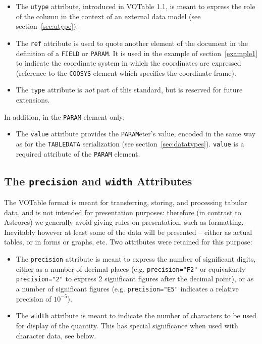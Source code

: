 \documentclass[11pt,a4paper]{ivoa}
\def\Aref#1{section~\ref{#1}}
\let\fg=\color
\def\attr#1{{\tt{\fg{DarkRed}#1}}}
\def\elem#1{{\tt{\fg{DarkRed}#1}}}
\def\attrval#1#2{{\tt{\fg{DarkRed}#1}="{\fg{DarkPurple}#2}"}}
\begin{document}
\begin{itemize}
\item   The \attr{utype} attribute, introduced in VOTable 1.1, is meant
        to express the role of the column in the context of an external
        data model (see \Aref{sec:utype}).

\item   The \attr{ref} attribute is used to quote another element of
        the document in the definition of a \elem{FIELD} or \elem{PARAM}.
        It is used in the example of \Aref{example1}
        to indicate the coordinate system in which the coordinates
        are expressed
        (reference to the \elem{COOSYS} element which specifies the
        coordinate frame).

\item   The \attr{type} attribute is {\em not} part of this standard,
        but is reserved for future extensions.

\end{itemize}

In addition, in the \elem{PARAM} element only:
\begin{itemize}
\item   The \attr{value} attribute provides the \elem{PARAM}eter's value,
        encoded in the same way as for the \elem{TABLEDATA} serialization
        (see \Aref{sec:datatypes}).
        \attr{value} is a required attribute of the \elem{PARAM} element.
\end{itemize}

\subsection{The \attr{precision} and \attr{width} Attributes}
\label{sec:form}


The VOTable format is meant for transferring, storing, and
processing tabular data, and is not intended for presentation
purposes: therefore (in contrast to Astrores) we generally avoid
giving rules on presentation, such as formatting.
Inevitably however at least some of the data will be presented --
either as actual tables,  or in forms or graphs, etc.
Two attributes were retained for this purpose:

\begin{itemize}
\item   The \attr{precision} attribute is meant to express the
        number of significant digits, either as a number of
        decimal places (e.g. \attrval{precision}{F2} or equivalently
        \attrval{precision}{2} to express 2 significant figures
        after the decimal point), or as a number of significant figures
        (e.g. \attrval{precision}{E5} indicates a relative precision
        of $10^{-5}$).

\item   The {\attr{width}} attribute %
        is meant to indicate
        the number of characters to be used for display of the quantity.
        This has special significance when used with character data,
        see below.
\end{itemize}
\end{document}
